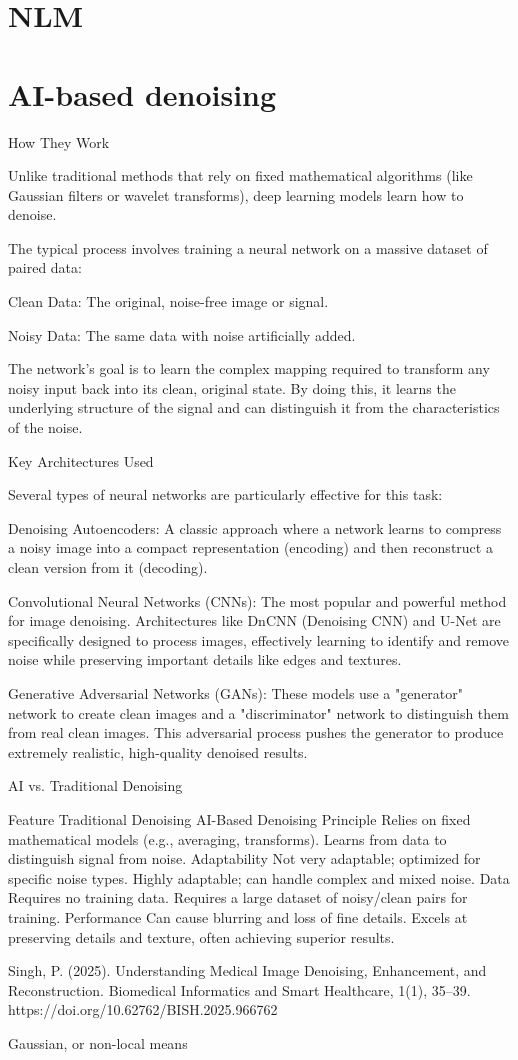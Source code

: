 \section{\gls{NLM}}

\section{\gls{AI}-based denoising}
How They Work

Unlike traditional methods that rely on fixed mathematical algorithms (like Gaussian filters or wavelet transforms), deep learning models learn how to denoise.

The typical process involves training a neural network on a massive dataset of paired data:

    Clean Data: The original, noise-free image or signal.

    Noisy Data: The same data with noise artificially added.

    The network's goal is to learn the complex mapping required to transform any noisy input back into its clean, original state. By doing this, it learns the underlying structure of the signal and can distinguish it from the characteristics of the noise.

Key Architectures Used

Several types of neural networks are particularly effective for this task:

    Denoising Autoencoders: A classic approach where a network learns to compress a noisy image into a compact representation (encoding) and then reconstruct a clean version from it (decoding).

Convolutional Neural Networks (CNNs): The most popular and powerful method for image denoising. Architectures like DnCNN (Denoising CNN) and U-Net are specifically designed to process images, effectively learning to identify and remove noise while preserving important details like edges and textures.

Generative Adversarial Networks (GANs): These models use a "generator" network to create clean images and a "discriminator" network to distinguish them from real clean images. This adversarial process pushes the generator to produce extremely realistic, high-quality denoised results.

AI vs. Traditional Denoising

Feature	Traditional Denoising	AI-Based Denoising
Principle	Relies on fixed mathematical models (e.g., averaging, transforms).	Learns from data to distinguish signal from noise.
Adaptability	Not very adaptable; optimized for specific noise types.	Highly adaptable; can handle complex and mixed noise.
Data	Requires no training data.	Requires a large dataset of noisy/clean pairs for training.
Performance	Can cause blurring and loss of fine details.	Excels at preserving details and texture, often achieving superior results.

Singh, P. (2025). Understanding Medical Image Denoising, Enhancement, and Reconstruction. Biomedical Informatics and Smart Healthcare, 1(1), 35–39. https://doi.org/10.62762/BISH.2025.966762

Gaussian,  or non-local means